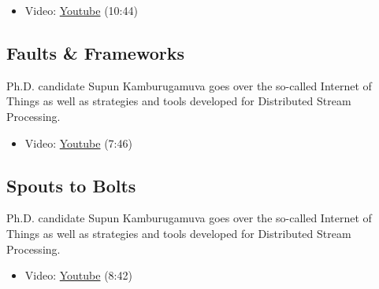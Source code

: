 \begin{itemize}
\tightlist
\item
  Video: \href{https://www.youtube.com/watch?v=Ok2Bo8D0EkE}{Youtube}
  (10:44)
\end{itemize}

\subsection{Faults \& Frameworks}\label{faults-frameworks}

Ph.D. candidate Supun Kamburugamuva goes over the so-called Internet of
Things as well as strategies and tools developed for Distributed Stream
Processing.

\begin{itemize}
\tightlist
\item
  Video: \href{https://www.youtube.com/watch?v=2ip9ttBMTlQ}{Youtube}
  (7:46)
\end{itemize}

\subsection{Spouts to Bolts}\label{spouts-to-bolts}

Ph.D. candidate Supun Kamburugamuva goes over the so-called Internet of
Things as well as strategies and tools developed for Distributed Stream
Processing.

\begin{itemize}
\tightlist
\item
  Video: \href{https://www.youtube.com/watch?v=E9E-ygRXcm8}{Youtube}
  (8:42)
\end{itemize}
